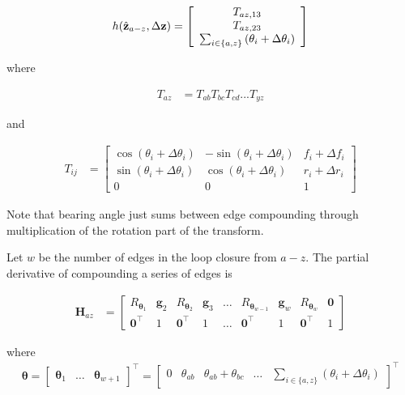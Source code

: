 \begin{align*}
	h(\hat{\mathbf{z}}_{a-z},\Delta\mathbf{z}) =  \left[\begin{array}{c}
	T_{az,13} \\ T_{az,23} \\ \sum_{i \in \{a,z\}} \left( \theta_i + \Delta\theta_i \right)
	\end{array}\right]
\end{align*}

where

\begin{align*}
  T_{az} &= T_{ab} T_{bc} T_{cd} ... T_{yz}
\end{align*}

and

\begin{align*}
  T_{ij} &= \left[\begin{array}{ccc}
  \cos(\theta_i + \Delta\theta_i) & -\sin(\theta_i + \Delta\theta_i) & f_i + \Delta f_i \\
  \sin(\theta_i + \Delta\theta_i) &  \cos(\theta_i + \Delta\theta_i) & r_i + \Delta r_i \\ 0 & 0 & 1
  \end{array}\right]
\end{align*}

Note that bearing angle just sums between edge compounding through multiplication of the rotation part of the transform.

Let $w$ be the number of edges in the loop closure from $a-z$.
The partial derivative of compounding a series of edges is

\begin{align*}
   \mathbf{H}_{az} &=
  \left[\begin{array}{ccccccccc}
  R_{\boldsymbol{\theta}_1} & \mathbf{g}_2 & R_{\boldsymbol{\theta}_2} & \mathbf{g}_3 &
  \dots & R_{\boldsymbol{\theta}_{w-1}} & \mathbf{g}_w & R_{\boldsymbol{\theta}_w} & \mathbf{0}\\
  \mathbf{0}^\top & 1 & \mathbf{0}^\top & 1 & \dots
   & \mathbf{0}^\top & 1 & \mathbf{0}^\top & 1 \end{array}\right]
\end{align*}

where
\begin{align*}
  \boldsymbol{\theta} = \left[\begin{array}{ccc}
  \boldsymbol{\theta}_1&
  \dots&
  \boldsymbol{\theta}_{w+1}
  \end{array}\right]^\top =  \left[\begin{array}{ccccc}
  0 & \theta_{ab} & \theta_{ab} + \theta_{bc} & \dots & \sum_{i \in \{a,z\}} \left( \theta_i + \Delta\theta_i \right)
  \end{array}\right]^\top
\end{align*}

